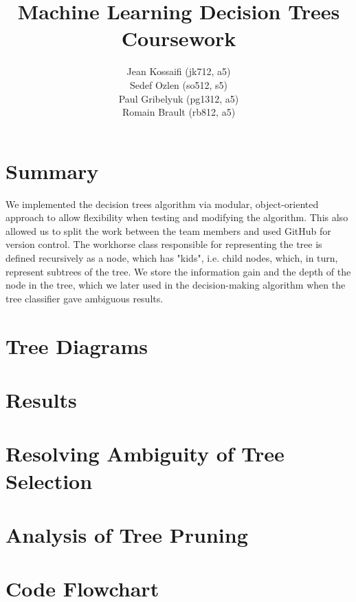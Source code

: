 \documentclass[11pt]{amsart}
\title{Machine Learning Decision Trees Coursework}
\author{Jean Kossaifi (jk712, a5) \\Sedef Ozlen (so512, s5) \\Paul Gribelyuk (pg1312, a5) \\Romain Brault (rb812, a5)}
\begin{document}
\maketitle
\section{Summary}
We implemented the decision trees algorithm via modular, object-oriented approach to allow flexibility when testing and modifying the algorithm.  This also allowed us to split the work between the team members and used GitHub for version control.  
The workhorse class responsible for representing the tree is defined recursively as a node, which has "kids", i.e. child nodes, which, in turn, represent subtrees of the tree.  We store the information gain and the depth of the node in the tree, which we later used in the decision-making algorithm when the tree classifier gave ambiguous results.

\section{Tree Diagrams}


\section{Results}


\section{Resolving Ambiguity of Tree Selection}


\section{Analysis of Tree Pruning}


\section{Code Flowchart}
\end{document}
